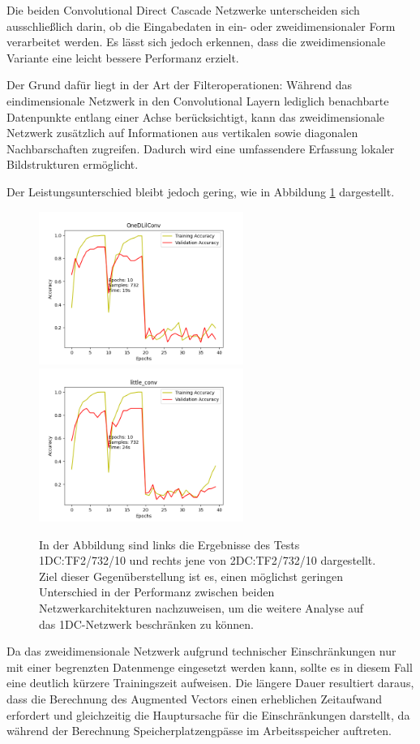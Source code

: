Die beiden Convolutional Direct Cascade Netzwerke unterscheiden sich ausschließlich darin, ob die Eingabedaten in ein- oder zweidimensionaler 
Form verarbeitet werden. Es lässt sich jedoch erkennen, dass die zweidimensionale Variante eine leicht bessere Performanz erzielt.

Der Grund dafür liegt in der Art der Filteroperationen: Während das eindimensionale Netzwerk in den Convolutional Layern lediglich benachbarte 
Datenpunkte entlang einer Achse berücksichtigt, kann das zweidimensionale Netzwerk zusätzlich auf Informationen aus vertikalen sowie diagonalen 
Nachbarschaften zugreifen. Dadurch wird eine umfassendere Erfassung lokaler Bildstrukturen ermöglicht.

Der Leistungsunterschied bleibt jedoch gering, wie in Abbildung \ref{fig:dim} dargestellt.

\begin{figure}[htpb]
    \includegraphics[height=5cm]{../../Plots/ba_plots/dimensionality/1dim_tr.png}
    \includegraphics[height=5cm]{../../Plots/ba_plots/dimensionality/2dim_tr.png}
    \caption{\label{fig:dim} 
    \small{In der Abbildung sind links die Ergebnisse des Tests 1DC:TF2/732/10 und rechts jene von 2DC:TF2/732/10 dargestellt. Ziel dieser 
    Gegenüberstellung ist es, einen möglichst geringen Unterschied in der Performanz zwischen beiden Netzwerkarchitekturen nachzuweisen, um 
    die weitere Analyse auf das 1DC-Netzwerk beschränken zu können.}}
\end{figure}

Da das zweidimensionale Netzwerk aufgrund technischer Einschränkungen nur mit einer begrenzten Datenmenge eingesetzt werden kann, sollte es in 
diesem Fall eine deutlich kürzere Trainingszeit aufweisen. 
Die längere Dauer resultiert daraus, dass die Berechnung des Augmented Vectors einen erheblichen Zeitaufwand erfordert und gleichzeitig die 
Hauptursache für die Einschränkungen darstellt, da während der Berechnung Speicherplatzengpässe im Arbeitsspeicher auftreten.

